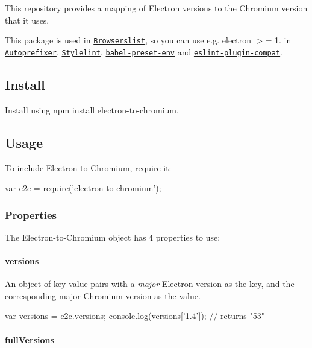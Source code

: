 This repository provides a mapping of Electron versions to the Chromium version that it uses.

This package is used in \href{https://github.com/ai/browserslist}{\tt Browserslist}, so you can use e.\+g. {\ttfamily electron $>$= 1.} in \href{https://github.com/postcss/autoprefixer}{\tt Autoprefixer}, \href{https://github.com/stylelint/stylelint}{\tt Stylelint}, \href{https://github.com/babel/babel-preset-env}{\tt babel-\/preset-\/env} and \href{https://github.com/amilajack/eslint-plugin-compat}{\tt eslint-\/plugin-\/compat}.

\subsection*{Install}

Install using {\ttfamily npm install electron-\/to-\/chromium}.

\subsection*{Usage}

To include Electron-\/to-\/\+Chromium, require it\+:


\begin{DoxyCode}
var e2c = require('electron-to-chromium');
\end{DoxyCode}


\subsubsection*{Properties}

The Electron-\/to-\/\+Chromium object has 4 properties to use\+:

\paragraph*{{\ttfamily versions}}

An object of key-\/value pairs with a {\itshape major} Electron version as the key, and the corresponding major Chromium version as the value.


\begin{DoxyCode}
var versions = e2c.versions;
console.log(versions['1.4']);
// returns "53"
\end{DoxyCode}


\paragraph*{{\ttfamily full\+Versions}}

